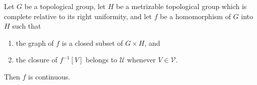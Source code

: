 Let $G$ be a topological group, let $H$ be a metrizable topological group which is complete relative to its right uniformity, and let $f$ be a homomorphism of $G$ into $H$ such that
\begin{enumerate}
\item[(i)] the graph of $f$ is a closed subset of $G \times H$, and
\item[(ii)] the closure of $f^{-1}[V]$ belongs to $\mathcal{U}$ whenever $V \in \mathcal{V}$.
\end{enumerate}
Then $f$ is continuous.
